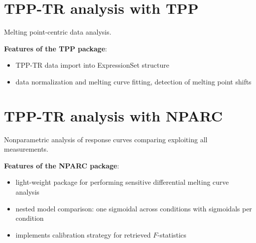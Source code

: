 \documentclass{article}
\newcommand{\hcode}[2][lgray]{{\ttfamily\color{vdgray}\colorbox{#1}{#2}}}
\begin{document}
\begin{multicols}{2}
\vspace{-2cm}
\noindent
\begin{minipage}[t]{\linewidth}
  \vspace{0.5cm}
  \section*{\huge TPP-TR analysis with \hcode{TPP}}
  Melting point-centric data analysis.

  \textbf{Features of the \hcode{TPP} package}:

  \begin{itemize}

  \item TPP-TR data import into ExpressionSet structure
  \item data normalization and melting curve fitting, detection of melting point shifts
  
  \end{itemize}
\end{minipage}

\noindent
\begin{minipage}[t]{\linewidth}
  \vspace{0.55cm}
  \section*{\huge TPP-TR analysis with \hcode{NPARC}}
  Nonparametric analysis of response curves comparing exploiting all measurements. 

  \textbf{Features of the \hcode{NPARC} package}:

  \begin{itemize}

  \item light-weight package for performing sensitive differential melting curve analysis
  \item nested model comparison: one sigmoidal across conditions with sigmoidals per condition
  \item implements calibration strategy for retrieved $F$-statistics

  \end{itemize}
\end{minipage}


\noindent
\begin{minipage}[t]{\linewidth}
  \vspace{0.55cm}

\end{minipage}
\end{multicols}
\end{document}
